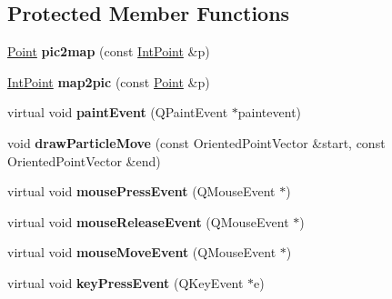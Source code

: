 \subsection*{Protected Member Functions}
\begin{DoxyCompactItemize}
\item 
\mbox{\label{classGMapping_1_1QParticleViewer_a5888fdb23af3742dd208469d7c4681cb}} 
\hyperlink{structGMapping_1_1point}{Point} {\bfseries pic2map} (const \hyperlink{structGMapping_1_1point}{Int\+Point} \&p)
\item 
\mbox{\label{classGMapping_1_1QParticleViewer_a4eb6ac9e7376019089224af9995cac17}} 
\hyperlink{structGMapping_1_1point}{Int\+Point} {\bfseries map2pic} (const \hyperlink{structGMapping_1_1point}{Point} \&p)
\item 
\mbox{\label{classGMapping_1_1QParticleViewer_a6dc4092e186b94cf01e6cb77af1fc899}} 
virtual void {\bfseries paint\+Event} (Q\+Paint\+Event $\ast$paintevent)
\item 
\mbox{\label{classGMapping_1_1QParticleViewer_abcdb7abdfb7ccc9d229f00fb6d99f8bf}} 
void {\bfseries draw\+Particle\+Move} (const Oriented\+Point\+Vector \&start, const Oriented\+Point\+Vector \&end)
\item 
\mbox{\label{classGMapping_1_1QParticleViewer_a782983a07984cf3ac24ed3d8174f313d}} 
virtual void {\bfseries mouse\+Press\+Event} (Q\+Mouse\+Event $\ast$)
\item 
\mbox{\label{classGMapping_1_1QParticleViewer_a64c039a71f18042cd000842996a1d8b0}} 
virtual void {\bfseries mouse\+Release\+Event} (Q\+Mouse\+Event $\ast$)
\item 
\mbox{\label{classGMapping_1_1QParticleViewer_a1368164743b1685589a6f63f87227d0a}} 
virtual void {\bfseries mouse\+Move\+Event} (Q\+Mouse\+Event $\ast$)
\item 
\mbox{\label{classGMapping_1_1QParticleViewer_ad3147f20306ffd2176b4ac818b612917}} 
virtual void {\bfseries key\+Press\+Event} (Q\+Key\+Event $\ast$e)
\end{DoxyCompactItemize}
